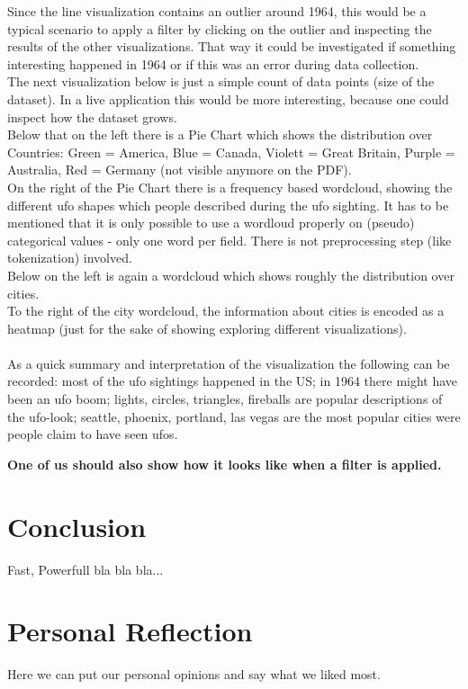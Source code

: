 \documentclass[bibliography=totoc]{article}
\begin{document}
Since the line visualization contains an outlier around 1964, this would
be a typical scenario to apply a filter by clicking on the outlier and inspecting the results of the other visualizations. That way
it could be investigated if something interesting happened in 1964 or if this was
an error during data collection.
\\
The next visualization below is just a simple count of data points (size of the dataset). 
In a live application this would be more interesting, because one could inspect how the 
dataset grows.
\\
Below that on the left there is a Pie Chart which shows the distribution over Countries:
Green = America, Blue = Canada, Violett = Great Britain, Purple = Australia, Red = Germany (not visible anymore on the PDF).
\\
On the right of the Pie Chart there is a frequency based wordcloud, showing the different ufo shapes which 
people described during the ufo sighting. It has to be mentioned that it is only possible to
use a wordloud properly on (pseudo) categorical values - only one word per field. There is not preprocessing step
(like tokenization) involved.
\\
Below on the left is again a wordcloud which shows roughly the distribution over cities.
\\
To the right of the city wordcloud, the information about cities is encoded as a 
heatmap (just for the sake of showing exploring different visualizations).
\\
\\
As a quick summary and interpretation of the visualization the following can 
be recorded: most of the ufo sightings happened in the US; in 1964 there might have been 
an ufo boom; lights, circles, triangles, fireballs are popular descriptions of the ufo-look;
seattle, phoenix, portland, las vegas are the most popular cities were people claim to have seen ufos.

\textbf{One of us should also show how it looks like when a filter is applied.}

\section{Conclusion}
Fast, Powerfull bla bla bla...

\section{Personal Reflection}
Here we can put our personal opinions and say what we liked most.
\end{document}
